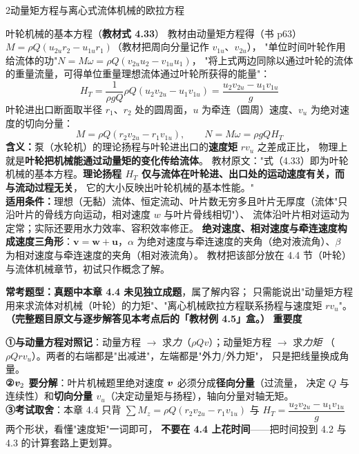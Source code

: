 \begin{kaodian}{2}{动量矩方程与离心式流体机械的欧拉方程}
\begin{gongshi}{叶轮机械的基本方程（\textbf{教材式 4.33}）}
教材由动量矩方程得（书 p63）$M=\rho Q\left(u_{2u}r_2-u_{1u}r_1\right)$（教材把周向分量记作 $v_{1u}$、$v_{2u}$），
"单位时间叶轮作用给流体的功"$N=M\omega=\rho Q\left(v_{2u}u_2-v_{1u}u_1\right)$，
"将上式两边同除以通过叶轮的流体的重量流量，可得单位重量理想流体通过叶轮所获得的能量"：
\[ H_T=\frac{1}{\rho gQ}\rho Q\left(u_2v_{2u}-u_1v_{1u}\right)=\frac{u_2v_{2u}-u_1v_{1u}}{g} \]
叶轮进出口断面取半径 $r_1$、$r_2$ 处的圆周面，$u$ 为牵连（圆周）速度、$v_u$ 为绝对速度的切向分量：
\[ M=\rho Q\left(r_2v_{2u}-r_1v_{1u}\right),\qquad N=M\omega=\rho gQH_T \]
\textbf{含义：}泵（水轮机）的理论扬程与叶轮进出口的\textbf{速度矩} $rv_u$ 之差成正比，
物理上就是\textbf{叶轮把机械能通过动量矩的变化传给流体}。
教材原文："式（4.33）即为叶轮机械的基本方程。\textbf{理论扬程 $H_T$ 仅与流体在叶轮进、出口处的运动速度有关，而与流动过程无关}，
它的大小反映出叶轮机械的基本性能。"\\
\textbf{适用条件：}理想（无黏）流体、恒定流动、叶片数无穷多且叶片无厚度（流体"只沿叶片的骨线方向运动，相对速度 $w$ 与叶片骨线相切"）、
流体沿叶片相对运动为定常；实际还要用水力效率、容积效率修正。
\textbf{绝对速度、相对速度与牵连速度构成速度三角形}：$\bm{v}=\bm{w}+\bm{u}$，$\alpha$ 为绝对速度与牵连速度的夹角（绝对液流角）、$\beta$ 为相对速度与牵连速度的夹角（相对液流角）。
教材把该部分放在 4.4 节（叶轮）与流体机械章节，初试只作概念了解。
\end{gongshi}

\textbf{常考题型：}\textbf{真题中本章 4.4 未见独立成题}，属了解内容；
只需能说出"动量矩方程用来求流体对机械（叶轮）的力矩"、"离心机械欧拉方程联系扬程与速度矩 $rv_u$"。\textbf{（完整题目原文与逐步解答见本考点后的「教材例 4.5」盒。）}
\textbf{重要度 }\quad{}\quad{}

\begin{banfa}
\textbf{①与动量方程对照记}：动量方程 $\to$ 求\emph{力}（$\rho Qv$）；动量矩方程 $\to$ 求\emph{力矩}
（$\rho Qrv_u$）。两者的右端都是"出减进"，左端都是"外力/外力矩"，
只是把线量换成角量。\\
\textbf{②$\bm{v}_2$ 要分解}：叶片机械题里绝对速度 $\bm{v}$ 必须分成\textbf{径向分量}（过流量，
决定 $Q$ 与连续性）和\textbf{切向分量 $v_u$}（决定动量矩与扬程），轴向分量对轴无矩。\\
\textbf{③考试取舍}：本章 4.4 只背 $\sum M_z=\rho Q(r_2v_{2u}-r_1v_{1u})$ 与
$H_T=\dfrac{u_2v_{2u}-u_1v_{1u}}{g}$ 两个形状，看懂"速度矩"一词即可，
\textbf{不要在 4.4 上花时间}——把时间投到 4.2 与 4.3 的计算套路上更划算。
\end{banfa}
\end{kaodian}

